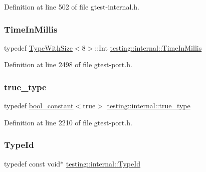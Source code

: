Definition at line 502 of file gtest-\/internal.\+h.

\mbox{\label{namespacetesting_1_1internal_a66a845df404b38fe85c5e14a069f255a}} 
\subsubsection{\texorpdfstring{Time\+In\+Millis}{TimeInMillis}}
{\footnotesize\ttfamily typedef \hyperlink{classtesting_1_1internal_1_1TypeWithSize}{Type\+With\+Size}$<$8$>$\+::Int \hyperlink{namespacetesting_1_1internal_a66a845df404b38fe85c5e14a069f255a}{testing\+::internal\+::\+Time\+In\+Millis}}



Definition at line 2498 of file gtest-\/port.\+h.

\mbox{\label{namespacetesting_1_1internal_a62f917c3424d8841de9b49b5ec28edb4}} 
\subsubsection{\texorpdfstring{true\+\_\+type}{true\_type}}
{\footnotesize\ttfamily typedef \hyperlink{structtesting_1_1internal_1_1bool__constant}{bool\+\_\+constant}$<$true$>$ \hyperlink{namespacetesting_1_1internal_a62f917c3424d8841de9b49b5ec28edb4}{testing\+::internal\+::true\+\_\+type}}



Definition at line 2210 of file gtest-\/port.\+h.

\mbox{\label{namespacetesting_1_1internal_ab1114197d3c657d8b7f8e0c5caa12d00}} 
\subsubsection{\texorpdfstring{Type\+Id}{TypeId}}
{\footnotesize\ttfamily typedef const void$\ast$ \hyperlink{namespacetesting_1_1internal_ab1114197d3c657d8b7f8e0c5caa12d00}{testing\+::internal\+::\+Type\+Id}}



